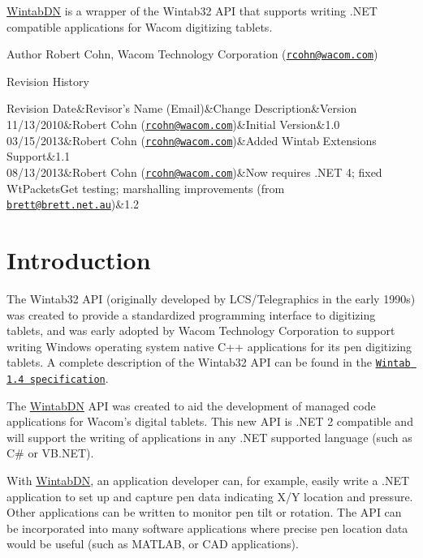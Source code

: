\hyperlink{namespace_wintab_d_n}{WintabDN} is a wrapper of the Wintab32 API that supports writing .NET compatible applications for Wacom digitizing tablets. \begin{DoxyAuthor}{Author}
Robert Cohn, Wacom Technology Corporation (\href{mailto:rcohn@wacom.com}{\tt rcohn@wacom.com})
\end{DoxyAuthor}
\begin{DoxyParagraph}{Revision History}
\begin{TabularC}{4}
\hline
Revision Date&Revisor's Name (Email)&Change Description&Version  \\
11/13/2010&Robert Cohn (\href{mailto:rcohn@wacom.com}{\tt rcohn@wacom.com})&Initial Version&1.0  \\
03/15/2013&Robert Cohn (\href{mailto:rcohn@wacom.com}{\tt rcohn@wacom.com})&Added Wintab Extensions Support&1.1  \\
08/13/2013&Robert Cohn (\href{mailto:rcohn@wacom.com}{\tt rcohn@wacom.com})&Now requires .NET 4; fixed WtPacketsGet testing; marshalling improvements (from \href{mailto:brett@brett.net.au}{\tt brett@brett.net.au})&1.2  \\
\end{TabularC}

\end{DoxyParagraph}
\hypertarget{index_intro_sec}{}\section{Introduction}\label{index_intro_sec}
The Wintab32 API (originally developed by LCS/Telegraphics in the early 1990s) was created to provide a standardized programming interface to digitizing tablets, and was early adopted by Wacom Technology Corporation to support writing Windows operating system native C++ applications for its pen digitizing tablets. A complete description of the Wintab32 API can be found in the \href{Wintab_v140.htm}{\tt Wintab 1.4 specification}.

The \hyperlink{namespace_wintab_d_n}{WintabDN} API was created to aid the development of managed code applications for Wacom's digital tablets. This new API is .NET 2 compatible and will support the writing of applications in any .NET supported language (such as C\# or VB.NET).

With \hyperlink{namespace_wintab_d_n}{WintabDN}, an application developer can, for example, easily write a .NET application to set up and capture pen data indicating X/Y location and pressure. Other applications can be written to monitor pen tilt or rotation. The API can be incorporated into many software applications where precise pen location data would be useful (such as MATLAB, or CAD applications).

